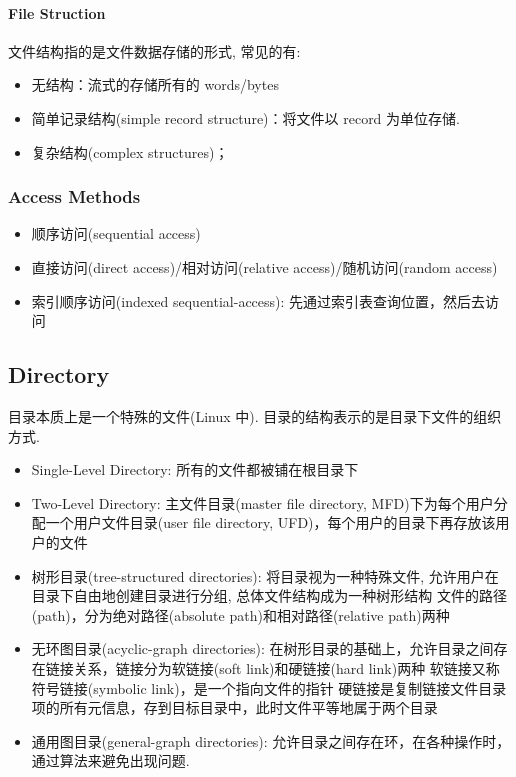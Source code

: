 \paragraph{File Struction}文件结构指的是文件数据存储的形式, 常见的有:
\begin{itemize}\small
    \item 无结构：流式的存储所有的 words/bytes
    \item 简单记录结构(simple record structure)：将文件以 record 为单位存储. 
    \item 复杂结构(complex structures)；
\end{itemize}

\subsubsection{Access Methods}
\begin{itemize}
    \item 顺序访问(sequential access)
    \item 直接访问(direct access)/相对访问(relative access)/随机访问(random access)
    \item 索引顺序访问(indexed sequential-access): 先通过索引表查询位置，然后去访问
\end{itemize}
\subsection{Directory}
目录本质上是一个特殊的文件(Linux 中). 目录的结构表示的是目录下文件的组织方式. 

\begin{itemize}\small
    \item Single-Level Directory: 所有的文件都被铺在根目录下
    \item Two-Level Directory: 主文件目录(master file directory, MFD)下为每个用户分配一个用户文件目录(user file directory, UFD)，每个用户的目录下再存放该用户的文件
    \item 树形目录(tree-structured directories): 将目录视为一种特殊文件, 允许用户在目录下自由地创建目录进行分组, 总体文件结构成为一种树形结构
    \subitem 文件的路径(path)，分为绝对路径(absolute path)和相对路径(relative path)两种
    \item 无环图目录(acyclic-graph directories): 在树形目录的基础上，允许目录之间存在链接关系，链接分为软链接(soft link)和硬链接(hard link)两种
    \subitem 软链接又称符号链接(symbolic link)，是一个指向文件的指针
    \subitem 硬链接是复制链接文件目录项的所有元信息，存到目标目录中，此时文件平等地属于两个目录
    \item 通用图目录(general-graph directories): 允许目录之间存在环，在各种操作时，通过算法来避免出现问题. 
\end{itemize}

